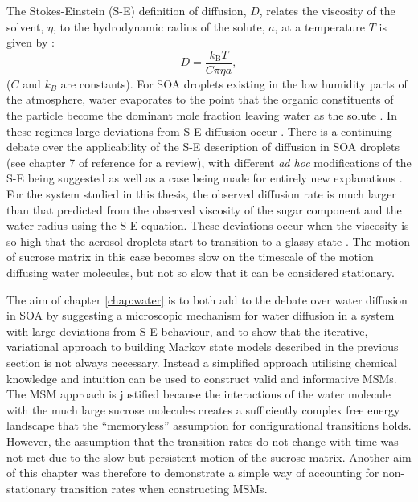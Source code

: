 The Stokes-Einstein (S-E) definition of diffusion, $D$, relates the viscosity of the solvent, $\eta$, to the hydrodynamic radius of the solute, $a$, at a temperature $T$ is given by \cite[chapter  17]{dill2010molecular}:
\begin{equation}\label{eqn:diffusion_intro}
D=\frac{k_{\mathrm{B}} T}{C \pi \eta a},
\end{equation}
($C$ and $k_{B}$ are constants).  For SOA droplets existing in the low humidity parts of the atmosphere, water evaporates to the point that the organic constituents of the particle become the dominant mole fraction leaving water as the solute \cite{powerTransitionLiquidSolidlike2013, Price2014, Molinero2005}. In these regimes large deviations from S-E diffusion occur \cite{powerTransitionLiquidSolidlike2013,Price2015,Chenyakin2017}. There is a continuing debate over the applicability of the S-E description of diffusion in SOA droplets (see chapter 7 of reference \cite{Ingram2017} for a review), with different \emph{ad hoc} modifications of the S-E being suggested \cite{Harris2009,price2016sucrose, Fernandez-Alonso2007} as well as a case being made for entirely new explanations \cite{saltzmanActivatedHoppingDynamical2006}. For the system studied in this thesis, the observed diffusion rate is much larger than that predicted from the observed viscosity of the sugar component and the water radius using the S-E equation. These deviations occur when the viscosity is so high that the aerosol droplets start to transition to a glassy state \cite{Bones2012}. The motion of sucrose matrix in this case becomes slow on the timescale of the motion diffusing water molecules, but not so slow that it can be considered stationary. 

The aim of chapter \ref{chap:water} is to both add to the debate over water diffusion in SOA by suggesting a microscopic mechanism for water diffusion in a system with large deviations from S-E behaviour, and to show that the iterative,  variational approach to building Markov state models described in the previous section is not always necessary. Instead a simplified approach  utilising chemical knowledge and intuition can be used to construct valid and informative MSMs. The MSM approach is justified because the interactions of the water molecule with the much large sucrose molecules creates a sufficiently complex free energy landscape that the ``memoryless'' assumption for configurational transitions holds.  However, the assumption that the transition rates do not change with time was not met due to the slow but persistent motion of the sucrose matrix. Another aim of this  chapter was therefore to demonstrate a simple way of accounting for non-stationary transition rates when constructing MSMs.  

